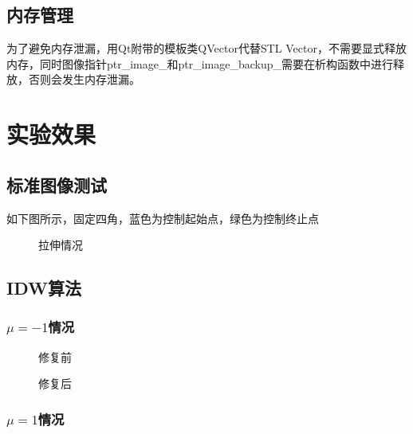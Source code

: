\documentclass[14pt]{scrartcl} %
\begin{document}
	\subsection{内存管理}
	
	为了避免内存泄漏，用Qt附带的模板类QVector代替STL Vector，不需要显式释放内存，同时图像指针ptr\_image\_和ptr\_image\_backup\_需要在析构函数中进行释放，否则会发生内存泄漏。
	
	
	
	\pagebreak
	
	\section{实验效果}
	
	\subsection{标准图像测试}
	如下图所示，固定四角，蓝色为控制起始点，绿色为控制终止点
	\begin{figure}[h] %
		\centering
		\caption{拉伸情况}
	\end{figure}
	
	\subsection{IDW算法}
	
	\subsubsection{$\mu=-1$情况}
	
	\begin{figure}[h] %
		\begin{minipage}[t]{0.5\linewidth}
			\centering
			\caption{修复前}
		\end{minipage}%
		\begin{minipage}[t]{0.5\linewidth}
			\centering
			\caption{修复后}
		\end{minipage}
	\end{figure}
	
	\subsubsection{$\mu=1$情况}
	
\end{document}
